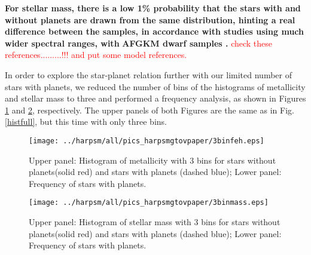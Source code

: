 \documentclass[structabstract]{aa}
\begin{document}



\textbf{For stellar mass, there is a low 1\% probability that the stars with and without planets are drawn from the same distribution, hinting a \textbf{real} difference between the samples, in accordance with studies using much wider spectral ranges, with}
\textbf{AFGKM dwarf samples \citep{Laws-2003,Lovis-2007,Johnson-2010}.} \textcolor{red}{check these references.........!!! and put some model references.} %





In order to explore the star-planet relation further with our limited number of stars with planets, we reduced the number of bins of the histograms of metallicity and stellar mass to three and performed a frequency analysis, as shown in Figures \ref{3binfeh} and \ref{3binmass}, respectively. The upper panels of both Figures are the same as in Fig. \ref{histfull}, but this time with only three bins. 

\begin{figure}[h]
\begin{center}
\texttt{[image: ../harpsm/all/pics\_harpsmgtovpaper/3binfeh.eps]}
\end{center}
\caption{Upper panel: Histogram of metallicity with 3 bins for stars without planets(solid red) and stars with planets (dashed blue); Lower panel: Frequency of stars with planets.}
\label{3binfeh}
\end{figure}

\begin{figure}[h]
\begin{center}
\texttt{[image: ../harpsm/all/pics\_harpsmgtovpaper/3binmass.eps]}
\end{center}
\caption{Upper panel: Histogram of stellar mass with 3 bins for stars without planets(solid red) and stars with planets (dashed blue); Lower panel: Frequency of stars with planets.}
\label{3binmass}
\end{figure}
\end{document}

